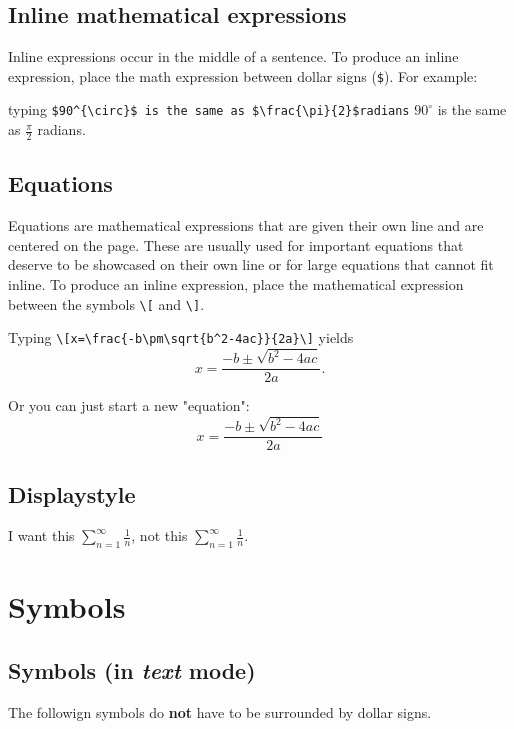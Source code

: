\documentclass{article} %
\begin{document}
    \subsection{Inline mathematical expressions}
    \quad Inline expressions occur in the middle of a sentence.  To produce an inline expression, place the math expression between dollar signs (\verb!$!).  For example:
    
    \quad typing \verb!$90^{\circ}$ is the same as $\frac{\pi}{2}$radians! $90^{\circ}$ is the same as $\frac{\pi}{2}$ radians.

    \subsection{Equations}
    \quad Equations are mathematical expressions that are given their own line and are centered on the page.  These are usually used for important equations that deserve to be showcased on their own line or for large equations that cannot fit inline. To produce an inline expression, place the mathematical expression  between the symbols  \verb!\[! and \verb!\]!. 
    
    Typing \verb!\[x=\frac{-b\pm\sqrt{b^2-4ac}}{2a}\]! yields \[x=\frac{-b\pm\sqrt{b^2-4ac}}{2a}.\]
    
    Or you can just start a new "equation":
    \begin{equation}
        x= \frac{-b\pm\sqrt{b^2-4ac}}{2a}
    \end{equation}
 
    \subsection{Displaystyle} 
    \quad I want  this $\displaystyle \sum_{n=1}^{\infty}\frac{1}{n}$, not this $\sum_{n=1}^{\infty}\frac{1}{n}.$

\newpage
\section{Symbols}

    \subsection{Symbols (in \emph{text} mode)}

    \quad The followign symbols do \textbf{not} have to be surrounded by dollar signs.

\newline
\end{document}

